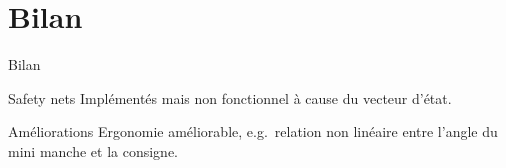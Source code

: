 \documentclass[footheight=2em]{beamer}
\begin{document}
\section*{Bilan}
\begin{frame}[c]{Bilan}
  \begin{block}{Safety nets}
    Implémentés mais non fonctionnel à cause du vecteur d'état.
  \end{block}
  \begin{block}{Améliorations}
    Ergonomie améliorable, e.g.\ relation non linéaire entre l'angle du
    mini manche et la consigne.
  \end{block}
\end{frame}
\end{document}
